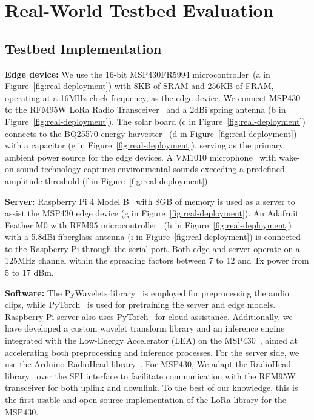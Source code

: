 \section{Real-World Testbed Evaluation}
\label{sec:testbed}

\subsection{Testbed Implementation}
\label{sec:testbed-implementation}

\noindent
\textbf{Edge device:} We use the 16-bit MSP430FR5994 microcontroller~\cite{texas2021msp430}(\textcircled{\small{a}} in Figure~\ref{fig:real-deployment}) with 8KB of SRAM and 256KB of FRAM, operating at a 16MHz clock frequency, as the edge device. We connect MSP430 to the RFM95W LoRa Radio Transceiver~\cite{hoperf2016RFM95} and a 2dBi spring antenna (\textcircled{\small{b}} in Figure~\ref{fig:real-deployment}). The solar board (\textcircled{\small{c}} in Figure~\ref{fig:real-deployment}) connects to the BQ25570 energy harvester~\cite{ti2019bq25570} (\textcircled{\small{d}} in Figure~\ref{fig:real-deployment}) with a capacitor (\textcircled{\small{e}} in Figure~\ref{fig:real-deployment}), serving as the primary ambient power source for the edge devices. A VM1010 microphone~\cite{vesper2017VM1010} with wake-on-sound technology captures environmental sounds exceeding a predefined amplitude threshold (\textcircled{\small{f}} in Figure~\ref{fig:real-deployment}).

\noindent
\textbf{Server:}
Raspberry Pi 4 Model B~\cite{RaspberryPi4B2019} with 8GB of memory is used as a server to assist the MSP430 edge device (\textcircled{\small{g}} in Figure~\ref{fig:real-deployment}). An Adafruit Feather M0 with RFM95 microcontroller~\cite{adafruit2019FeatherM0} (\textcircled{\small{h}} in Figure~\ref{fig:real-deployment}) with a 5.8dBi fiberglass antenna (\textcircled{\small{i}} in Figure~\ref{fig:real-deployment}) is connected to the Raspberry Pi through the serial port. Both edge and server operate on a 125MHz channel within the spreading factors between 7 to 12 and Tx power from 5 to 17 dBm.

\noindent
\textbf{Software:} The PyWavelets library~\cite{Lee2019PyWavelet} is employed for preprocessing the audio clips, while PyTorch~\cite{paszke2019pytorch} is used for pretraining the server and edge models. Raspberry Pi server also uses PyTorch~\cite{paszke2019pytorch} for cloud assistance. Additionally, we have developed a custom wavelet transform library and an inference engine~\cite{zhang2022demo} integrated with the Low-Energy Accelerator (LEA) on the MSP430~\cite{MSPLEA2016}, aimed at accelerating both preprocessing and inference processes. For the server side, we use the Arduino RadioHead library~\cite{mccauley2013radiohead}. For MSP430, We adapt the RadioHead library~\cite{mccauley2013radiohead, eccob2020msp430} over the SPI interface to facilitate communication with the RFM95W transceiver for both uplink and downlink. To the best of our knowledge, this is the first usable and open-source implementation of the LoRa library for the MSP430. 

